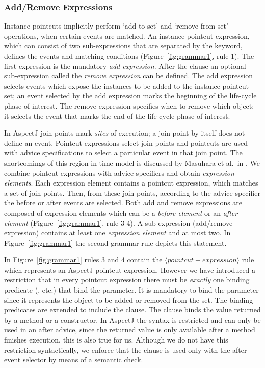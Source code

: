 \subsubsection{Add/Remove Expressions}
\label{sect:addrem}
Instance pointcuts implicitly perform `add to set' and `remove from set' operations, when certain events are matched. An instance pointcut expression, which can consist of two sub-expressions that are separated by the  keyword,  defines the events and matching conditions (Figure~\ref{fig:grammar1}, rule 1). The first expression is the mandatory \emph{add expression}. After the  clause an optional sub-expression called the \emph{remove expression} can be defined. The add expression selects events which expose the instances to be added to the instance pointcut set; an event selected by the add expression marks the beginning of the life-cycle phase of interest.  The remove expression specifies when to remove which object: it selects the event that marks the end of the life-cycle phase of interest. 

 
In AspectJ join points mark \emph{sites} of execution; a join point by itself does not define an event. 
Pointcut expressions select join points and pointcuts are used with advice specifications to select a particular event in that join point. The shortcomings of this region-in-time model is discussed by Masuhara et al.\ in \cite{masuharafine}.
We combine pointcut expressions with advice specifiers and obtain \emph{expression elements}. Each expression element contains a pointcut expression, which matches a set of join points. Then, from these join points, according to the advice specifier the before or after events are selected.
Both add and remove expressions are composed of expression elements which can be a \emph{before element} or an \emph{after element} (Figure~\ref{fig:grammar1}, rule 3-4). A sub-expression (add/remove expression) contains at least one \emph{expression element} and at most two. In Figure~\ref{fig:grammar1} the second grammar rule depicts this statement. 

In Figure~\ref{fig:grammar1} rules 3 and 4 contain the $\langle pointcut-expression\rangle$ rule which represents an AspectJ pointcut expression. However we have introduced a restriction that in every pointcut expression there must be \emph{exactly} one binding predicate (,  etc.) that bind the  parameter. It is mandatory to bind the  parameter since it represents the object to be added or removed from the set. The binding predicates are extended to include the  clause. The  clause binds the value returned by a method or a constructor. In AspectJ the syntax is restricted and  can only be used in an after advice, since the returned value is only available after a method finishes execution, this is also true for us. Although we do not have this restriction syntactically, we enforce that the  clause is used only with the after event selector by means of a semantic check.  


